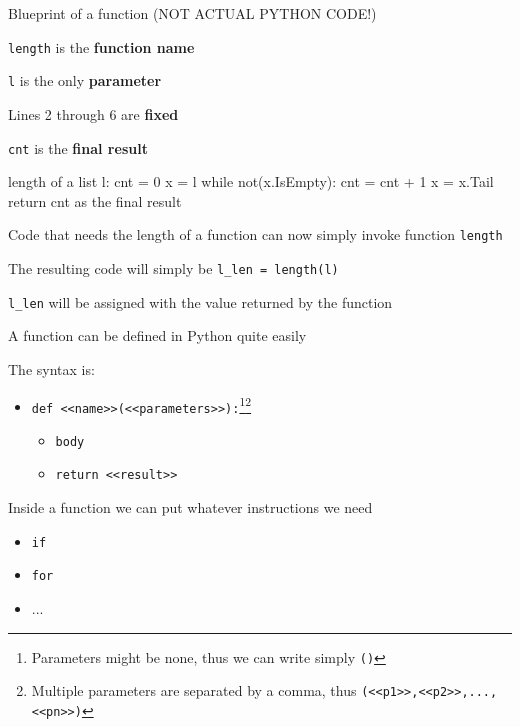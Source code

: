 \documentclass{beamer}
\begin{document}
\begin{frame}[fragile]{Blueprint of a function (NOT ACTUAL PYTHON CODE!)}
\begin{codewithblock}{\pause \item \texttt{length} is the \textbf{function name} \item \texttt{l} is the only \textbf{parameter} \item Lines 2 through 6 are \textbf{fixed} \item \texttt{cnt} is the \textbf{final result}}
length of a list l:
  cnt = 0
  x = l
  while not(x.IsEmpty):
    cnt = cnt + 1
    x = x.Tail
  return cnt as the final result 
\end{codewithblock}
\end{frame}

\begin{slide}{
\item Code that needs the length of a function can now simply invoke function \texttt{length}
\item The resulting code will simply be \texttt{l\_len = length(l)}
\item \texttt{l\_len} will be assigned with the value returned by the function
}\end{slide}

\begin{slide}{
\item A function can be defined in Python quite easily
\item The syntax is:
\begin{itemize}
\item \texttt{def <<name>>(<<parameters>>):}\footnote{Parameters might be none, thus we can write simply \texttt{()}}\footnote{Multiple parameters are separated by a comma, thus \texttt{(<<p1>>,<<p2>>,...,<<pn>>)}}
\begin{itemize}
\item \texttt{body}
\item \texttt{return <<result>>}
\end{itemize}
\end{itemize}
\item Inside a function we can put whatever instructions we need
\begin{itemize}
\item \texttt{if}
\item \texttt{for}
\item ...
\end{itemize}
}\end{slide}
\end{document}
